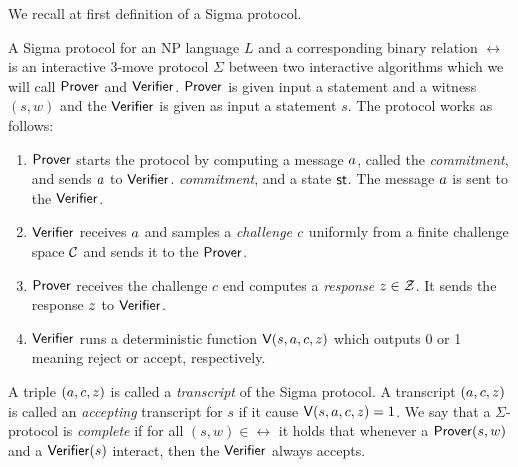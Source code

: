 We recall at first definition of a Sigma protocol. 

\begin{definition} A Sigma protocol for an NP language $L$ and a corresponding binary relation $\rel$ is an interactive 3-move protocol $\Sigma$ between two interactive algorithms which we will call $\mathsf{Prover}$ and $\mathsf{Verifier}$. $\mathsf{Prover}$ is given input a statement and a witness $(s, w)$ and the $\mathsf{Verifier}$ is given as input a statement $s$. The protocol works as follows:
\begin{enumerate}
\item $\mathsf{Prover}$ starts the protocol by computing a message $a$, called the \emph{commitment}, and sends $a$ to $\mathsf{Verifier}$. \emph{commitment}, and a state $\mathsf{st}$. The message $a$ is sent to the $\mathsf{Verifier}$.
\item $\mathsf{Verifier}$ receives $a$ and samples a \emph{challenge} $c$ uniformly from a finite challenge space $\mathcal{C}$ and sends it to the $\mathsf{Prover}$.
\item $\mathsf{Prover}$ receives the challenge $c$ end computes a \emph{response} $z \in \mathcal{Z}$. It sends the response $z$ to $\mathsf{Verifier}$.
\item $\mathsf{Verifier}$ runs a deterministic function $\mathsf{V}(s,a,c,z)$ which outputs 0 or 1 meaning reject or accept, respectively.
\end{enumerate}
A triple $(a,c,z)$ is called a \emph{transcript} of the Sigma protocol. A transcript $(a,c,z)$ is called an \emph{accepting} transcript for $s$ if it cause $\mathsf{V}(s,a,c,z) =1$. 
We say that a $\Sigma$-protocol is \emph{complete} if for all $(s, w) \in \rel$ it holds that whenever a $\mathsf{Prover}(s,w)$ and a $\mathsf{Verifier}(s)$ interact, then the $\mathsf{Verifier}$ always accepts. 
\end{definition}



